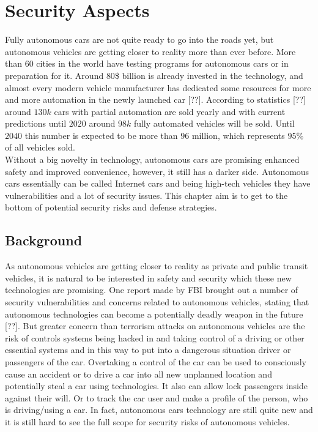 \chapter{Security Aspects}
\label{chap:5}
%
Fully autonomous cars are not quite ready to go into the roads yet, but autonomous vehicles are getting closer to reality more than ever before. More than $60$ cities in the world have testing programs for autonomous cars or in preparation for it. Around $80$\$ billion is already invested in the technology, and almost every modern vehicle manufacturer has dedicated some resources for more and more automation in the newly launched car [??].  According to statistics [??] around $130k$ cars with partial automation are sold yearly and with current predictions until $2020$ around $98k$ fully automated vehicles will be sold. Until $2040$ this number is expected to be more than $96$ million, which represents $95$\% of all vehicles sold. \\

Without a big novelty in technology, autonomous cars are promising enhanced safety and improved convenience, however, it still has a darker side. Autonomous cars essentially can be called Internet cars and being high-tech vehicles they have vulnerabilities and a lot of security issues. This chapter aim is to get to the bottom of potential security risks and defense strategies.

\section{Background}

As autonomous vehicles are getting closer to reality as private and public transit vehicles, it is natural to be interested in safety and security which these new technologies are promising. One report made by FBI brought out a number of security vulnerabilities and concerns related to autonomous vehicles, stating that autonomous technologies can become a potentially deadly weapon in the future [??]. But greater concern than terrorism attacks on autonomous vehicles are the risk of controls systems being hacked in and taking control of a driving or other essential systems and in this way to put into a dangerous situation driver or passengers of the car. Overtaking a control of the car can be used to consciously cause an accident or to drive a car into all new unplanned location and potentially steal a car using technologies. It also can allow lock passengers inside against their will. Or to track the car user and make a profile of the person, who is driving/using a car. In fact, autonomous cars technology are still quite new and it is still hard to see the full scope for security risks of autonomous vehicles. \\

